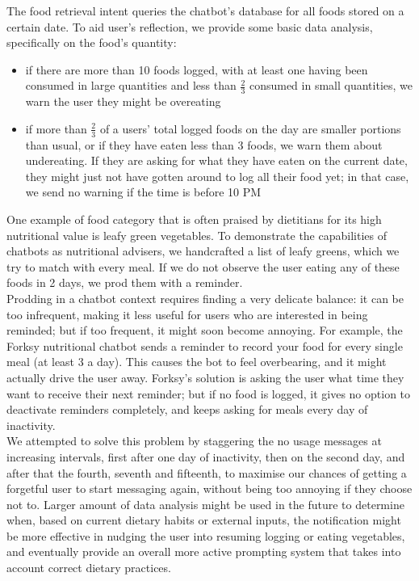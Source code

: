 The food retrieval intent queries the chatbot's database for all foods stored on a certain date. To aid user's reflection, we provide some basic data analysis, specifically on the food's quantity: 
\begin{itemize}
\item if there are more than 10 foods logged, with at least one having been consumed in large quantities and less than $\frac{2}{3}$ consumed in small quantities, we warn the user they might be overeating
\item if more than $\frac{2}{3}$ of a users' total logged foods on the day are smaller portions than usual, or if they have eaten less than 3 foods, we warn them about undereating. If they are asking for what they have eaten on the current date, they might just not have gotten around to log all their food yet; in that case, we send no warning if the time is before 10 PM
\end{itemize}

One example of food category that is often praised by dietitians for its high nutritional value \cite{bishoppgreens} is leafy green vegetables. To demonstrate the capabilities of chatbots as nutritional advisers, we handcrafted a list of leafy greens, which we try to match with every meal. If we do not observe the user eating any of these foods in 2 days, we prod them with a reminder. \\
Prodding in a chatbot context requires finding a very delicate balance: it can be too infrequent, making it less useful for users who are interested in being reminded; but if too frequent, it  might soon become annoying. For example, the Forksy nutritional chatbot \cite{forksywebsite} sends a reminder to record your food for every single meal (at least 3 a day). This causes the bot to feel overbearing, and it might actually drive the user away. Forksy's solution is asking the user what time they want to receive their next reminder; but if no food is logged, it gives no option to deactivate reminders completely, and keeps asking for meals every day of inactivity. \\
We attempted to solve this problem by staggering the no usage messages at increasing intervals, first after one day of inactivity, then on the second day, and after that the fourth, seventh and fifteenth, to maximise our chances of getting a forgetful user to start messaging again, without being too annoying if they choose not to. Larger amount of data analysis might be used in the future to determine when, based on current dietary habits or external inputs, the notification might be more effective in nudging the user into resuming logging or eating vegetables, and eventually provide an overall more active prompting system that takes into account correct dietary practices.

